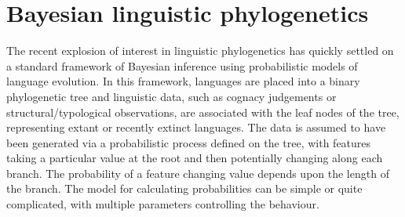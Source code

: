 \documentclass[twocolumn,10pt]{scrartcl}
\begin{document}


\section{Bayesian linguistic phylogenetics}

The recent explosion of interest in linguistic phylogenetics has quickly settled on a standard framework of Bayesian inference using probabilistic models of language evolution.  In this framework, languages are placed into a binary phylogenetic tree and linguistic data, such as cognacy judgements or structural/typological observations, are associated with the leaf nodes of the tree, representing extant or recently extinct languages.  The data is assumed to have been generated via a probabilistic process defined on the tree, with features taking a particular value at the root and then potentially changing along each branch.  The probability of a feature changing value depends upon the length of the branch.  The model for calculating probabilities can be simple or quite complicated, with multiple parameters controlling the behaviour.
\end{document}
